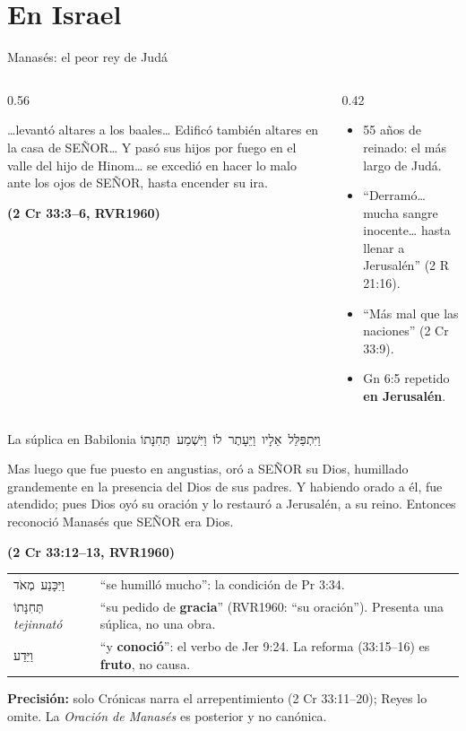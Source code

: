 \documentclass[hyperref={bookmarks=false},aspectratio=169]{beamer}
\newcommand{\heb}[1]{\mbox{\foreignlanguage{hebrew}{#1}}}
\newcommand{\SENOR}{S{\fontsize{0.78em}{1em}\selectfont EÑOR}}
\newcommand{\fuente}[1]{\par\hfill{\upshape\bfseries\footnotesize\textcolor{azul}{#1}}}
\newcommand{\destacar}[1]{\textbf{\textcolor{azul}{#1}}}
\newcommand{\precision}[1]{{\footnotesize\color{gris}\textbf{Precisión:} #1}}
\begin{document}
\section{En Israel}

\begin{frame}{Manasés: el peor rey de Judá}
\begin{columns}[t,onlytextwidth]
\begin{column}{0.56\textwidth}
\begin{cita}\ldots{}levantó altares a los baales\ldots{} Edificó también altares en la casa de \SENOR\ldots{} Y pasó sus hijos por fuego en el valle del hijo de Hinom\ldots{} se excedió en hacer lo malo ante los ojos de \SENOR, hasta encender su ira.\fuente{(2 Cr 33:3--6, RVR1960)}\end{cita}
\end{column}
\begin{column}{0.42\textwidth}\small\RaggedRight
\begin{itemize}
\item 55 años de reinado: el más largo de Judá.
\item ``Derramó\ldots{} mucha sangre inocente\ldots{} hasta llenar a Jerusalén'' (2 R 21:16).
\item ``Más mal que las naciones'' (2 Cr 33:9).
\item Gn 6:5 repetido \destacar{en Jerusalén}.
\end{itemize}
\end{column}
\end{columns}
\end{frame}

\begin{frame}{La súplica en Babilonia}
\centering\heb{וַיִּתְפַּלֵּל אֵלָיו וַיֵּעָתֶר לוֹ וַיִּשְׁמַע תְּחִנָּתוֹ}
\begin{cita}Mas luego que fue puesto en angustias, oró a \SENOR{} su Dios, humillado grandemente en la presencia del Dios de sus padres. Y habiendo orado a él, fue atendido; pues Dios oyó su oración y lo restauró a Jerusalén, a su reino. Entonces reconoció Manasés que \SENOR{} era Dios.\fuente{(2 Cr 33:12--13, RVR1960)}\end{cita}
\scriptsize\renewcommand{\arraystretch}{1.1}
\begin{tabular}{@{}>{\RaggedRight\arraybackslash}p{2.6cm}>{\RaggedRight\arraybackslash}p{9.0cm}@{}}
\heb{וַיִּכָּנַע מְאֹד} & ``se humilló mucho'': la condición de Pr 3:34. \\
\heb{תְּחִנָּתוֹ} \emph{tejinnató} & ``su pedido de \destacar{gracia}'' (RVR1960: ``su oración''). Presenta una súplica, no una obra. \\
\heb{וַיֵּדַע} & ``y \destacar{conoció}'': el verbo de Jer 9:24. La reforma (33:15--16) es \destacar{fruto}, no causa. \\
\end{tabular}\par
\precision{solo Crónicas narra el arrepentimiento (2 Cr 33:11--20); Reyes lo omite. La \emph{Oración de Manasés} es posterior y no canónica.}
\end{frame}
\end{document}

